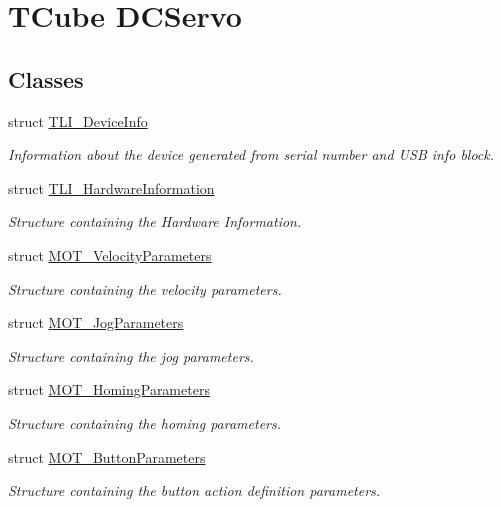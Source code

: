 \hypertarget{group___t_cube_d_c_servo}{}\section{T\+Cube D\+C\+Servo}
\label{group___t_cube_d_c_servo}
\subsection*{Classes}
\begin{DoxyCompactItemize}
\item 
struct \hyperlink{struct_t_l_i___device_info}{T\+L\+I\+\_\+\+Device\+Info}
\begin{DoxyCompactList}\small\item\em Information about the device generated from serial number and U\+SB info block. \end{DoxyCompactList}\item 
struct \hyperlink{struct_t_l_i___hardware_information}{T\+L\+I\+\_\+\+Hardware\+Information}
\begin{DoxyCompactList}\small\item\em Structure containing the Hardware Information. \end{DoxyCompactList}\item 
struct \hyperlink{struct_m_o_t___velocity_parameters}{M\+O\+T\+\_\+\+Velocity\+Parameters}
\begin{DoxyCompactList}\small\item\em Structure containing the velocity parameters. \end{DoxyCompactList}\item 
struct \hyperlink{struct_m_o_t___jog_parameters}{M\+O\+T\+\_\+\+Jog\+Parameters}
\begin{DoxyCompactList}\small\item\em Structure containing the jog parameters. \end{DoxyCompactList}\item 
struct \hyperlink{struct_m_o_t___homing_parameters}{M\+O\+T\+\_\+\+Homing\+Parameters}
\begin{DoxyCompactList}\small\item\em Structure containing the homing parameters. \end{DoxyCompactList}\item 
struct \hyperlink{struct_m_o_t___button_parameters}{M\+O\+T\+\_\+\+Button\+Parameters}
\begin{DoxyCompactList}\small\item\em Structure containing the button action definition parameters. \end{DoxyCompactList}\item 

\end{DoxyCompactItemize}
